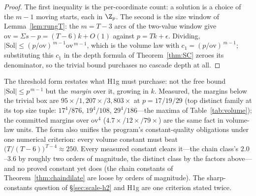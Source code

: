 \begin{proof}
The first inequality is the per-coordinate count: a solution is a
choice of the $m-1$ moving starts, each in $\Z_p$. The second is the
size window of Lemma~\ref{lem:rungT}: the $m=T-3$ arcs of the
two-value window give $\mathrm{ov}=\Sigma s-p=(T-6)k+O(1)$ against
$p=Tk+\epsilon$. Dividing,
$|\mathrm{Sol}|\le(p/\mathrm{ov})^{\,m-1}\mathrm{ov}^{\,m-1}$, which is
the volume law with $c_1=(p/\mathrm{ov})^{\,m-1}$; substituting this
$c_1$ in the depth formula of Theorem~\ref{thm:SC} zeroes its
denominator, so the trivial bound purchases no cascade depth at all.
\end{proof}

The threshold form restates what H1g must purchase: not the free
bound $|\mathrm{Sol}|\le p^{\,m-1}$ but the \emph{margin} over it,
growing in $k$. Measured, the margins below the trivial box are
$95\times/1{,}207\times/3{,}803\times$ at $p=17/19/29$ (top distinct
family at its top size tuple: $17^{4}/876$, $19^{4}/108$,
$29^{4}/186$---the maxima of Table~\ref{tab:volume}); the committed
margins over $\mathrm{ov}^{4}$ ($4.7\times/12\times/79\times$) are
the same fact in volume-law units. The form also unifies the program's
constant-quality obligations under one numerical criterion: every
volume constant must beat $\bigl(T/(T-6)\bigr)^{\,T-4}\approx250$.
Every measured constant clears it---the chain class's
$2.0$--$3.6$ by roughly two orders of magnitude, the distinct class by
the factors above---and no proved constant yet does (the chain
constants of Theorem~\ref{thm:chaindilate} are loose by orders of
magnitude). The sharp-constants question of \S\ref{sec:scale-h2} and
H1g are one criterion stated twice.


